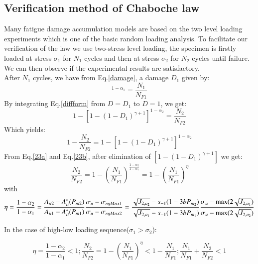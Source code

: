 \documentclass[3p,times,procedia,number]{elsarticle}
\begin{document}
\clearpage
\subsection{Verification method of Chaboche law}

Many fatigue damage accumulation models are based on the two level loading experiments which is one of the basic random loading analysis. To facilitate our verification of the law we use two-stress level loading, the specimen is firstly loaded at stress $\sigma_1$ for $N_1$ cycles and then at stress $\sigma_2$ for $N_2$ cycles until failure. We can then observe if the experimental results are satisfactory.\\
After $N_1$ cycles, we have from Eq.\eqref{damage}, a damage $D_1$ given by:
\begin{equation}
[1-(1-D_1)^{\gamma+1}]^{1-\alpha_1}=\frac{N_1}{N_{F1}}
\label{23a}
\end{equation}
By integrating Eq.\eqref{diffform} from $D=D_1$ to $D=1$, we get:
\begin{equation}
1-[1-(1-D_1)^{\gamma+1}]^{1-\alpha_2}=\frac{N_2}{N_{F2}}
\end{equation}
Which yields:
\begin{equation}1-\frac{N_2}{N_{F2}}=1-[1-(1-D_1)^{\gamma+1}]^{1-\alpha_2}
\label{23b}
\end{equation}
From Eq.\eqref{23a} and Eq.\eqref{23b}, after elimination of $[1-(1-D_1)^{\gamma+1}]$ we get:
\begin{equation} \frac{N_2}{N_{F2}}=1-(\frac{N_1}{N_{F1}})^\frac{1-\alpha_2}{1-\alpha_1}=1-(\frac{N_1}{N_{F1}})^\eta\end{equation}
with
\begin{equation}\eta=\frac{1-\alpha_2}{1-\alpha_1}=
\frac{A_{\uppercase\expandafter{\romannumeral2 2}} - A_{\uppercase\expandafter{\romannumeral2}}^\ast(P_{m2})}{A_{\uppercase\expandafter{\romannumeral2 1}} - A_{\uppercase\expandafter{\romannumeral2}}^\ast(P_{m1})}\frac{ \sigma_{u} - \sigma_{eqMax1}}{ \sigma_{u} - \sigma_{eqMax2}}=
\frac{\sqrt{J_{2,a_2}} - s_{-1}(1-3bP_{m_2})}{\sqrt{J_{2,a_1}} - s_{-1}(1-3bP_{m_1})}\frac{ \sigma_{u} - \max(2\sqrt{J_{2,a_1}})}{  \sigma_{u} - \max(2\sqrt{J_{2,a_2}})}
\label{eta}
\end{equation}

In the case of high-low loading sequence($\sigma_1>\sigma_2$):

$$\eta=\frac{1-\alpha_2}{1-\alpha_1}<1;\frac{N_2}{N_{F2}}=1-(\frac{N_1}{N_{F1}})^\eta<1-\frac{N_1}{N_{F1}};\frac{N_1}{N_{F1}}+\frac{N_2}{N_{F2}}<1$$
\end{document}
